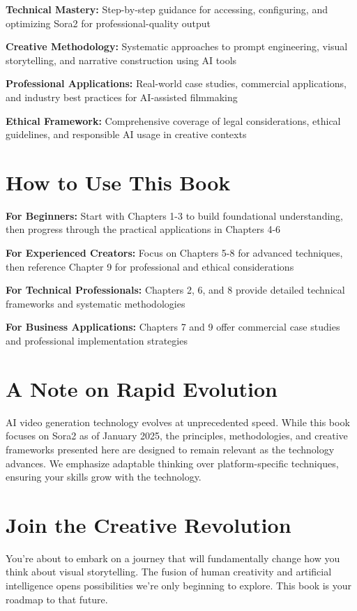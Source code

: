 \documentclass[11pt,letterpaper]{book}
\begin{document}
\textbf{Technical Mastery:} Step-by-step guidance for accessing, configuring, and optimizing Sora2 for professional-quality output

\textbf{Creative Methodology:} Systematic approaches to prompt engineering, visual storytelling, and narrative construction using AI tools

\textbf{Professional Applications:} Real-world case studies, commercial applications, and industry best practices for AI-assisted filmmaking

\textbf{Ethical Framework:} Comprehensive coverage of legal considerations, ethical guidelines, and responsible AI usage in creative contexts

\section*{How to Use This Book}

\textbf{For Beginners:} Start with Chapters 1-3 to build foundational understanding, then progress through the practical applications in Chapters 4-6

\textbf{For Experienced Creators:} Focus on Chapters 5-8 for advanced techniques, then reference Chapter 9 for professional and ethical considerations

\textbf{For Technical Professionals:} Chapters 2, 6, and 8 provide detailed technical frameworks and systematic methodologies

\textbf{For Business Applications:} Chapters 7 and 9 offer commercial case studies and professional implementation strategies

\section*{A Note on Rapid Evolution}

AI video generation technology evolves at unprecedented speed. While this book focuses on Sora2 as of January 2025, the principles, methodologies, and creative frameworks presented here are designed to remain relevant as the technology advances. We emphasize adaptable thinking over platform-specific techniques, ensuring your skills grow with the technology.

\section*{Join the Creative Revolution}

You're about to embark on a journey that will fundamentally change how you think about visual storytelling. The fusion of human creativity and artificial intelligence opens possibilities we're only beginning to explore. This book is your roadmap to that future.
\end{document}
